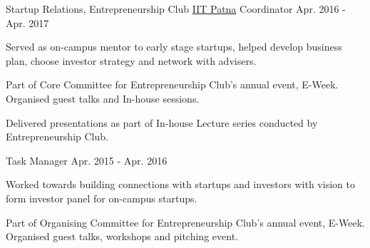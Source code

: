 
\begin{cvpositions}


\cvroletwo
	{Startup Relations, Entrepreneurship Club} %
	{\href{https://www.iitp.ac.in}{IIT Patna}} %
	{Coordinator} %
	{Apr. 2016 - Apr. 2017} %
	{\begin{cvitems} %
		\item {Served as on-campus mentor to early stage startups, helped develop business plan, choose investor strategy and network with advisers.}
		\item {Part of Core Committee for Entrepreneurship Club's annual event, E-Week. Organised guest talks and In-house sessions.}
		\item {Delivered presentations as part of In-house Lecture series conducted by Entrepreneurship Club.}
	\end{cvitems}}
	{Task Manager} %
	{Apr. 2015 - Apr. 2016} %
	{\begin{cvitems} %
		\item {Worked towards building connections with startups and investors with vision to form investor panel for on-campus startups.}
		\item {Part of Organising Committee for Entrepreneurship Club's annual event, E-Week. Organised guest talks, workshops and pitching event.}
	\end{cvitems}}

\end{cvpositions}
